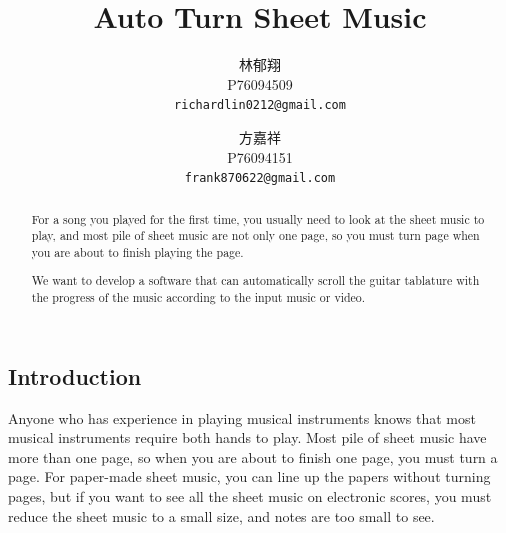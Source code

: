\documentclass[10pt,twocolumn,letterpaper]{article}
\begin{document}
\begin{CJK}{UTF8}{bsmi}

\title{Auto Turn Sheet Music}

\author{林郁翔\\
P76094509\\
{\tt\small richardlin0212@gmail.com}
\and
方嘉祥\\
P76094151\\
{\tt\small frank870622@gmail.com}
}

\maketitle

\begin{abstract}
   For a song you played for the first time, you usually need to look at the sheet music to play, and most pile of sheet music are not only one page, so you must turn page when you are about to finish playing the page.

   We want to develop a software that can automatically scroll the guitar tablature with the progress of the music according to the input music or video.
\end{abstract}

\section{Introduction}

Anyone who has experience in playing musical instruments knows that most musical instruments require both hands to play.
Most pile of sheet music have more than one page, so when you are about to finish one page, you must turn a page.
For paper-made sheet music, you can line up the papers without turning pages, but if you want to see all the sheet music on electronic scores, you must reduce the sheet music to a small size, and notes are too small to see.


\end{CJK}
\end{document}
